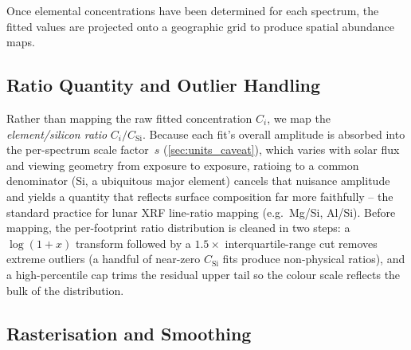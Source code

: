 \documentclass[journal,lettersize]{IEEEtran}
\begin{document}
Once elemental concentrations have been determined for each spectrum, the
fitted values are projected onto a geographic grid to produce spatial
abundance maps.

\subsection{Ratio Quantity and Outlier Handling}\label{sec:map_ratio}

Rather than mapping the raw fitted concentration $C_i$, we map the
\emph{element/silicon ratio} $C_i / C_{\mathrm{Si}}$. Because each fit's
overall amplitude is absorbed into the per-spectrum scale factor~$s$
(\cref{sec:units_caveat}), which varies with solar flux and viewing
geometry from exposure to exposure, ratioing to a common denominator
(Si, a ubiquitous major element) cancels that nuisance amplitude and
yields a quantity that reflects surface composition far more faithfully --
the standard practice for lunar XRF line-ratio mapping (e.g.\ Mg/Si,
Al/Si). Before mapping, the per-footprint ratio distribution is cleaned
in two steps: a $\log(1+x)$ transform followed by a $1.5\times$
interquartile-range cut removes extreme outliers (a handful of near-zero
$C_{\mathrm{Si}}$ fits produce non-physical ratios), and a high-percentile
cap trims the residual upper tail so the colour scale reflects the bulk of
the distribution.

\subsection{Rasterisation and Smoothing}\label{sec:map_raster}
\end{document}
